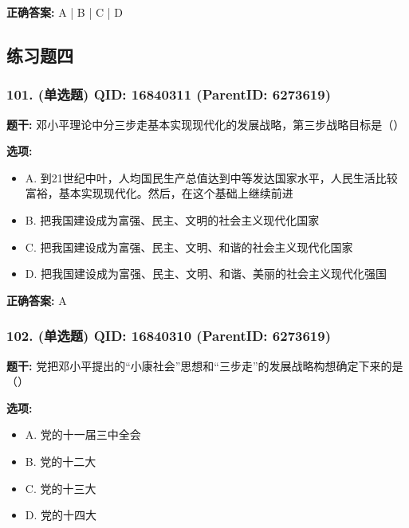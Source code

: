 \documentclass[12pt,UTF8]{ctexart}
\begin{document}
\textbf{正确答案:}
A | B | C | D

\vspace{0.3em}\hrulefill\vspace{0.7em}

\subsection*{练习题四}

\subsubsection*{101. (单选题) \small QID: 16840311 (ParentID: 6273619)}

\textbf{题干:}
邓小平理论中分三步走基本实现现代化的发展战略，第三步战略目标是（）



\textbf{选项:}
\begin{itemize}[leftmargin=*]

  \item A. 到21世纪中叶，人均国民生产总值达到中等发达国家水平，人民生活比较富裕，基本实现现代化。然后，在这个基础上继续前进

  \item B. 把我国建设成为富强、民主、文明的社会主义现代化国家

  \item C. 把我国建设成为富强、民主、文明、和谐的社会主义现代化国家

  \item D. 把我国建设成为富强、民主、文明、和谐、美丽的社会主义现代化强国

\end{itemize}

\textbf{正确答案:}
A

\vspace{0.3em}\hrulefill\vspace{0.7em}

\subsubsection*{102. (单选题) \small QID: 16840310 (ParentID: 6273619)}

\textbf{题干:}
党把邓小平提出的“小康社会”思想和“三步走”的发展战略构想确定下来的是（）



\textbf{选项:}
\begin{itemize}[leftmargin=*]

  \item A. 党的十一届三中全会

  \item B. 党的十二大

  \item C. 党的十三大

  \item D. 党的十四大

\end{itemize}
\end{document}
